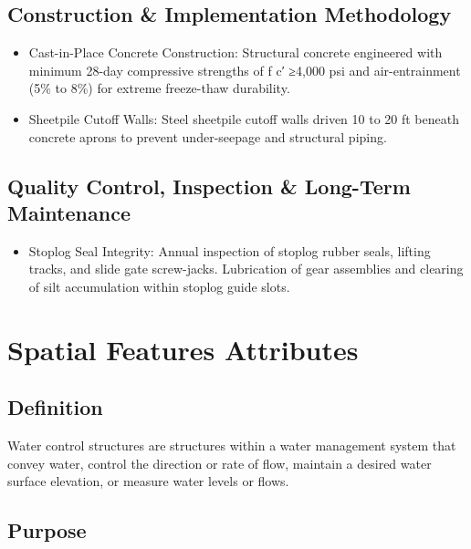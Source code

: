 \documentclass[
  letterpaper,
  DIV=11,
  numbers=noendperiod]{scrreprt}
\providecommand{\tightlist}{%
  \setlength{\itemsep}{0pt}\setlength{\parskip}{0pt}}
\begin{document}
\subsection{Construction \& Implementation
Methodology}\label{construction-implementation-methodology-14}

\begin{itemize}
\item
  Cast-in-Place Concrete Construction: Structural concrete engineered
  with minimum 28-day compressive strengths of f c′ ≥4,000 psi and
  air-entrainment (5\% to 8\%) for extreme freeze-thaw durability.
\item
  Sheetpile Cutoff Walls: Steel sheetpile cutoff walls driven 10 to 20
  ft beneath concrete aprons to prevent under-seepage and structural
  piping.
\end{itemize}

\subsection{Quality Control, Inspection \& Long-Term
Maintenance}\label{quality-control-inspection-long-term-maintenance-14}

\begin{itemize}
\tightlist
\item
  Stoplog Seal Integrity: Annual inspection of stoplog rubber seals,
  lifting tracks, and slide gate screw-jacks. Lubrication of gear
  assemblies and clearing of silt accumulation within stoplog guide
  slots.
\end{itemize}

\section{Spatial Features Attributes}\label{spatial-features-attributes}

\subsection{Definition}\label{definition-13}

Water control structures are structures within a water management system
that convey water, control the direction or rate of flow, maintain a
desired water surface elevation, or measure water levels or flows.

\subsection{Purpose}\label{purpose-16}
\end{document}
